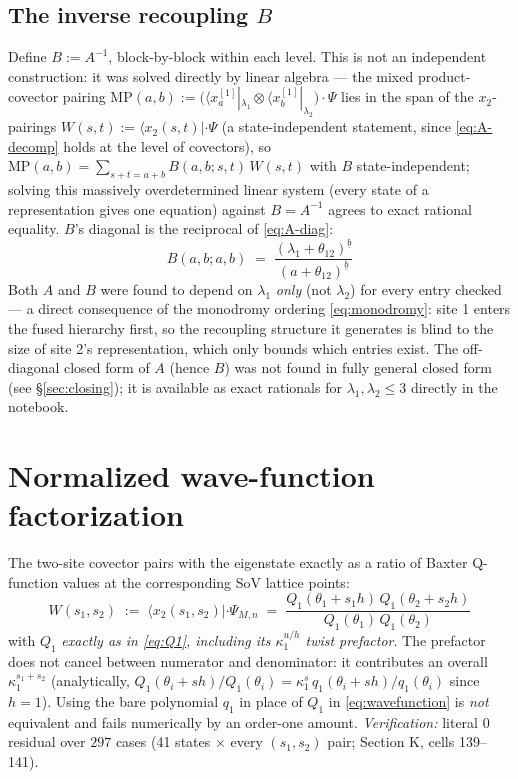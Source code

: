 \documentclass[11pt]{article}
\newcommand{\ffact}[2]{#1^{\underline{#2}}}   %
\begin{document}
\subsection{The inverse recoupling $B$}

Define $B:=A^{-1}$, block-by-block within each level. This is not an independent construction: it
was solved directly by linear algebra --- the mixed product-covector pairing
$\mathrm{MP}(a,b):=\bigl(\langle x^{[1]}_a|_{\lambda_1}\otimes\langle x^{[1]}_b|_{\lambda_2}\bigr)\cdot\Psi$
lies in the span of the $x_2$-pairings $W(s,t):=\langle x_2(s,t)|\cdot\Psi$ (a state-independent
statement, since \eqref{eq:A-decomp} holds at the level of covectors), so
$\mathrm{MP}(a,b)=\sum_{s+t=a+b}B(a,b;s,t)\,W(s,t)$ with $B$ state-independent; solving this
massively overdetermined linear system (every state of a representation gives one equation) against
$B=A^{-1}$ agrees to exact rational equality. $B$'s diagonal is the reciprocal of \eqref{eq:A-diag}:
\begin{equation}
  \boxed{\;B(a,b;a,b) \;=\; \frac{\ffact{(\lambda_1+\theta_{12})}{b}}{\ffact{(a+\theta_{12})}{b}}\;}
  \label{eq:B-diag}
\end{equation}
Both $A$ and $B$ were found to depend on $\lambda_1$ \emph{only} (not $\lambda_2$) for every entry
checked --- a direct consequence of the monodromy ordering \eqref{eq:monodromy}: site 1 enters the
fused hierarchy first, so the recoupling structure it generates is blind to the size of site 2's
representation, which only bounds which entries exist. The off-diagonal closed form of $A$ (hence
$B$) was not found in fully general closed form (see \S\ref{sec:closing}); it is available as exact
rationals for $\lambda_1,\lambda_2\le3$ directly in the notebook.

\section{Normalized wave-function factorization}
\label{sec:wavefunction}

The two-site covector pairs with the eigenstate exactly as a ratio of Baxter Q-function values at
the corresponding SoV lattice points:
\begin{equation}
  \boxed{\;W(s_1,s_2) \;:=\; \langle x_2(s_1,s_2)|\cdot\Psi_{M,n} \;=\;
  \frac{Q_1(\theta_1+s_1h)\,Q_1(\theta_2+s_2h)}{Q_1(\theta_1)\,Q_1(\theta_2)}\;}
  \label{eq:wavefunction}
\end{equation}
with $Q_1$ \emph{exactly as in \eqref{eq:Q1}, including its $\kappa_1^{u/h}$ twist prefactor}. The
prefactor does not cancel between numerator and denominator: it contributes an overall
$\kappa_1^{s_1+s_2}$ (analytically, $Q_1(\theta_i+sh)/Q_1(\theta_i)=\kappa_1^{s}\,
q_1(\theta_i+sh)/q_1(\theta_i)$ since $h=1$). Using the bare polynomial $q_1$ in place of $Q_1$ in
\eqref{eq:wavefunction} is \emph{not} equivalent and fails numerically by an order-one amount.
\emph{Verification:} literal $0$ residual over $297$ cases (41 states $\times$ every $(s_1,s_2)$
pair; Section K, cells 139--141).
\end{document}
